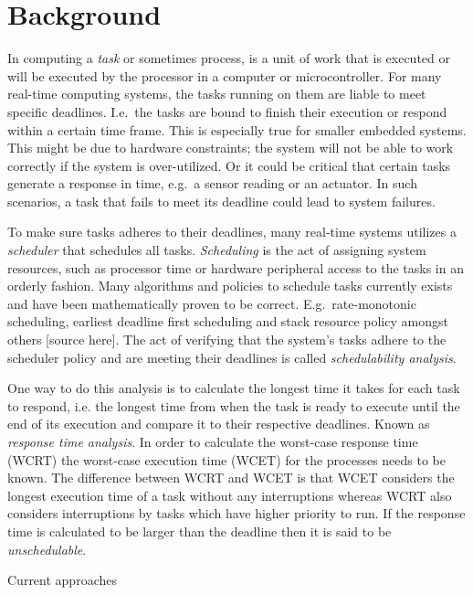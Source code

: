 \section{Background}
In computing a \emph{task} or sometimes process, is a unit of work that is
executed or will be executed by the processor in a computer or microcontroller.
For many real-time computing systems, the tasks running on them are liable to
meet specific deadlines. I.e.\ the tasks are bound to finish their execution or
respond within a certain time frame. This is especially true for smaller
embedded systems. This might be due to hardware constraints; the system will
not be able to work correctly if the system is over-utilized. Or it could be
critical that certain tasks generate a response in time, e.g.\ a sensor reading
or an actuator. In such scenarios, a task that fails to meet its deadline could
lead to system failures.

To make sure tasks adheres to their deadlines, many real-time systems utilizes
a \emph{scheduler} that schedules all tasks. \emph{Scheduling} is the act of
assigning system resources, such as processor time or hardware peripheral
access to the tasks in an orderly fashion. Many algorithms and policies to
schedule tasks currently exists and have been mathematically proven to be
correct.  E.g.\ rate-monotonic scheduling, earliest deadline first scheduling
and stack resource policy amongst others [source here]. The act of verifying
that the system's tasks adhere to the scheduler policy and are meeting their
deadlines is called \emph{schedulability analysis}. 

One way to do this analysis is to calculate the longest time it takes for each
task to respond, i.e. the longest time from when the task is ready to execute
until the end of its execution and compare it to their respective deadlines.
Known as \emph{response time analysis}. In order to calculate the worst-case
response time (WCRT) the worst-case execution time (WCET) for the processes
needs to be known. The difference between WCRT and WCET is that WCET considers
the longest execution time of a task without any interruptions whereas WCRT
also considers interruptions by tasks which have higher priority to run.  If
the response time is calculated to be larger than the deadline then it is said
to be \emph{unschedulable}.

Current approaches



